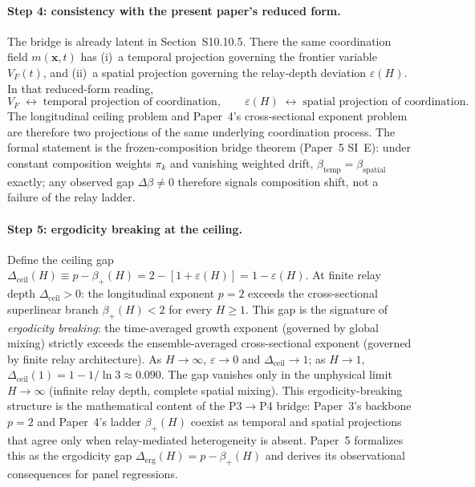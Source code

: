 \documentclass[11pt]{article}
\begin{document}
\paragraph{Step 4: consistency with the present paper's reduced form.}
The bridge is already latent in Section~S10.10.5.
There the same coordination field $m(\mathbf{x},t)$ has
(i)~a temporal projection governing the frontier variable $V_F(t)$, and
(ii)~a spatial projection governing the relay-depth deviation
$\varepsilon(H)$.  In that reduced-form reading,
\[
V_F\;\leftrightarrow\;\text{temporal projection of coordination},\qquad
\varepsilon(H)\;\leftrightarrow\;\text{spatial projection of coordination}.
\]
The longitudinal ceiling problem and Paper~4's
cross-sectional exponent problem are therefore two projections of the same
underlying coordination process.
The formal statement is the frozen-composition bridge theorem (Paper~5 SI~E): under constant composition weights $\pi_k$ and vanishing weighted drift, $\beta_{\mathrm{temp}}=\beta_{\mathrm{spatial}}$ exactly; any observed gap $\Delta\beta\neq 0$ therefore signals composition shift, not a failure of the relay ladder.

\paragraph{Step 5: ergodicity breaking at the ceiling.}
Define the ceiling gap $\Delta_{\mathrm{ceil}}(H)\equiv p-\beta_+(H)=2-[1+\varepsilon(H)]=1-\varepsilon(H)$.
At finite relay depth $\Delta_{\mathrm{ceil}}>0$: the longitudinal exponent $p{=}2$ exceeds the cross-sectional superlinear branch $\beta_+(H)<2$ for every $H\ge 1$.  This gap is the signature of \emph{ergodicity breaking}: the time-averaged growth exponent (governed by global mixing) strictly exceeds the ensemble-averaged cross-sectional exponent (governed by finite relay architecture).
As $H\to\infty$, $\varepsilon\to 0$ and $\Delta_{\mathrm{ceil}}\to 1$; as $H\to 1$, $\Delta_{\mathrm{ceil}}(1)=1-1/\ln 3\approx 0.090$.
The gap vanishes only in the unphysical limit $H\to\infty$ (infinite relay depth, complete spatial mixing).
This ergodicity-breaking structure is the mathematical content of the P3$\to$P4 bridge: Paper~3's backbone $p{=}2$ and Paper~4's ladder $\beta_+(H)$ coexist as temporal and spatial projections that agree only when relay-mediated heterogeneity is absent.  Paper~5 formalizes this as the ergodicity gap $\Delta_{\mathrm{erg}}(H)=p-\beta_+(H)$ and derives its observational consequences for panel regressions.
\end{document}
